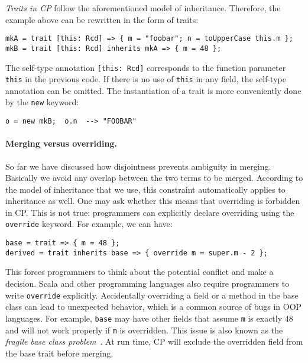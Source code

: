 \emph{Traits in CP} follow the aforementioned model of inheritance. Therefore,
the example above can be rewritten in the form of traits:
\begin{lstlisting}
mkA = trait [this: Rcd] => { m = "foobar"; n = toUpperCase this.m };
mkB = trait [this: Rcd] inherits mkA => { m = 48 };
\end{lstlisting}
The self-type annotation \lstinline{[this: Rcd]} corresponds to the function
parameter \lstinline{this} in the previous code. If there is no use of
\lstinline{this} in any field, the self-type annotation can be omitted. The
instantiation of a trait is more conveniently done by the \lstinline{new}
keyword:
\begin{lstlisting}
o = new mkB;  o.n  --> "FOOBAR"
\end{lstlisting}

\paragraph{Merging versus overriding.}
So far we have discussed how disjointness prevents ambiguity in merging.
Basically we avoid any overlap between the two terms to be merged. According to
the model of inheritance that we use, this constraint automatically applies to
inheritance as well. One may ask whether this means that overriding is forbidden
in CP. This is not true: programmers can explicitly declare overriding using the
\lstinline{override} keyword. For example, we can have:
\begin{lstlisting}
base = trait => { m = 48 };
derived = trait inherits base => { override m = super.m - 2 };
\end{lstlisting}
This forces programmers to think about the potential conflict and make a
decision. Scala and other programming languages also require programmers to
write \lstinline{override} explicitly. Accidentally overriding a field or a
method in the base class can lead to unexpected behavior, which is a common
source of bugs in OOP languages. For example, \lstinline{base} may have other
fields that assume \lstinline{m} is exactly 48 and will not work properly if
\lstinline{m} is overridden. This issue is also known as the \emph{fragile base
class problem}~\citep{mikhajlov1998study}. At run time, CP will exclude the
overridden field from the base trait before merging.

